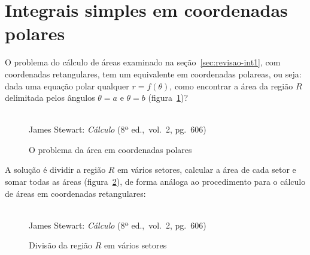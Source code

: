 \section{Integrais simples em coordenadas polares}
\label{sec:int1polar}

O problema do cálculo de áreas examinado na
seção~\ref{sec:revisao-int1}, com coordenadas retangulares, tem um
equivalente em coordenadas polareas, ou seja: dada uma equação polar
qualquer $r = f(\theta)$, como encontrar a área da região $R$
delimitada pelos ângulos $\theta = a$ e $\theta = b$
(figura~\ref{fig:areapolar1})?

\begin{figure}[H]
  \begin{center}
    \caption{O problema da área em coordenadas polares}
    \label{fig:areapolar1}
    \\
    \footnotesize{James Stewart: \emph{Cálculo} (8ª ed.,\ vol.\ 2, pg.\ 606)}
  \end{center}
\end{figure}

A solução é dividir a região $R$ em vários setores, calcular a área de
cada setor e somar todas as áreas (figura~\ref{fig:areapolar2}), de
forma análoga ao procedimento para o cálculo de áreas em coordenadas
retangulares:

\begin{figure}[H]
  \begin{center}
    \caption{Divisão da região $R$ em vários setores}
    \label{fig:areapolar2}
    \\
    \footnotesize{James Stewart: \emph{Cálculo} (8ª ed.,\ vol.\ 2, pg.\ 606)}
  \end{center}
\end{figure}

